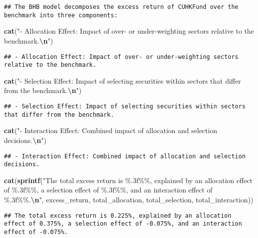 \documentclass[
]{article}
\newenvironment{Shaded}{\begin{snugshade}}{\end{snugshade}}
\newcommand{\FunctionTok}[1]{\textcolor[rgb]{0.13,0.29,0.53}{\textbf{#1}}}
\newcommand{\NormalTok}[1]{#1}
\newcommand{\SpecialCharTok}[1]{\textcolor[rgb]{0.81,0.36,0.00}{\textbf{#1}}}
\newcommand{\StringTok}[1]{\textcolor[rgb]{0.31,0.60,0.02}{#1}}
\begin{document}
\begin{verbatim}
## The BHB model decomposes the excess return of CUHKFund over the benchmark into three components:
\end{verbatim}

\begin{Shaded}
\begin{Highlighting}[]
\FunctionTok{cat}\NormalTok{(}\StringTok{"{-} Allocation Effect: Impact of over{-} or under{-}weighting sectors relative to the benchmark.}\SpecialCharTok{\textbackslash{}n}\StringTok{"}\NormalTok{)}
\end{Highlighting}
\end{Shaded}

\begin{verbatim}
## - Allocation Effect: Impact of over- or under-weighting sectors relative to the benchmark.
\end{verbatim}

\begin{Shaded}
\begin{Highlighting}[]
\FunctionTok{cat}\NormalTok{(}\StringTok{"{-} Selection Effect: Impact of selecting securities within sectors that differ from the benchmark.}\SpecialCharTok{\textbackslash{}n}\StringTok{"}\NormalTok{)}
\end{Highlighting}
\end{Shaded}

\begin{verbatim}
## - Selection Effect: Impact of selecting securities within sectors that differ from the benchmark.
\end{verbatim}

\begin{Shaded}
\begin{Highlighting}[]
\FunctionTok{cat}\NormalTok{(}\StringTok{"{-} Interaction Effect: Combined impact of allocation and selection decisions.}\SpecialCharTok{\textbackslash{}n}\StringTok{"}\NormalTok{)}
\end{Highlighting}
\end{Shaded}

\begin{verbatim}
## - Interaction Effect: Combined impact of allocation and selection decisions.
\end{verbatim}

\begin{Shaded}
\begin{Highlighting}[]
\FunctionTok{cat}\NormalTok{(}\FunctionTok{sprintf}\NormalTok{(}\StringTok{"The total excess return is \%.3f\%\%, explained by an allocation effect of \%.3f\%\%, a selection effect of \%.3f\%\%, and an interaction effect of \%.3f\%\%.}\SpecialCharTok{\textbackslash{}n}\StringTok{"}\NormalTok{, }
\NormalTok{            excess\_return, total\_allocation, total\_selection, total\_interaction))}
\end{Highlighting}
\end{Shaded}

\begin{verbatim}
## The total excess return is 0.225%, explained by an allocation effect of 0.375%, a selection effect of -0.075%, and an interaction effect of -0.075%.
\end{verbatim}
\end{document}
